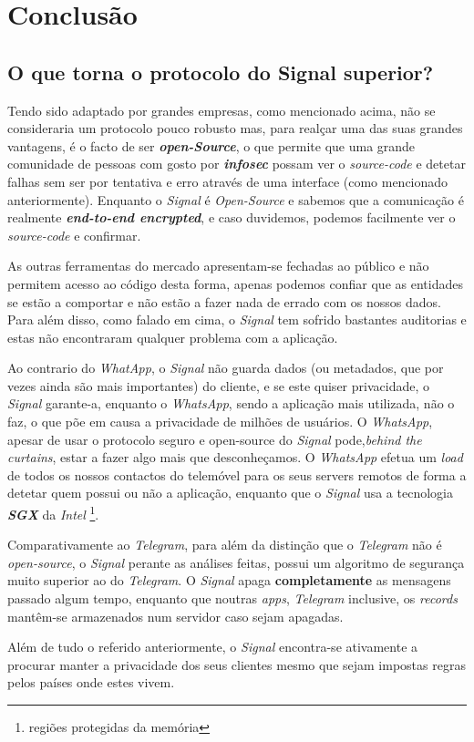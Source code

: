 \section{Conclusão}


\subsection{O que torna o protocolo do Signal superior?}

Tendo sido adaptado por grandes empresas, como mencionado acima, não se consideraria um protocolo pouco robusto mas, para realçar uma das suas grandes vantagens, é o facto de ser \textbf{\textit{open-Source}}, o que permite que uma grande comunidade de pessoas com gosto por \textit{\textbf{infosec}} possam ver o \textit{source-code} e detetar falhas sem ser por tentativa e erro através de uma interface (como mencionado anteriormente). Enquanto o \textit{Signal} é \textit{Open-Source} e sabemos que a comunicação é realmente \textbf{\textit{end-to-end encrypted}}, e caso duvidemos, podemos facilmente ver o \textit{source-code} e confirmar. 

As outras ferramentas do mercado apresentam-se fechadas ao público e não permitem acesso ao código desta forma, apenas podemos confiar que as entidades se estão a comportar e não estão a fazer nada de errado com os nossos dados. Para além disso, como falado em cima, o \textit{Signal} tem sofrido bastantes auditorias e estas não encontraram qualquer problema com a aplicação.

Ao contrario do \textit{WhatApp}, o \textit{Signal} não guarda dados (ou metadados, que por vezes ainda são mais importantes) do cliente, e se este quiser privacidade, o \textit{Signal} garante-a, enquanto o \textit{WhatsApp}, sendo a aplicação mais utilizada, não o faz, o que põe em causa a privacidade de milhões de usuários. O \textit{WhatsApp}, apesar de usar o protocolo seguro e open-source do \textit{Signal} pode,\textit{behind the curtains}, estar a fazer algo mais que desconheçamos. O \textit{WhatsApp} efetua um \textit{load} de todos os nossos contactos do telemóvel para os seus servers remotos de forma a detetar quem possui ou não a aplicação, enquanto que o \textit{Signal} usa a tecnologia \textit{\textbf{SGX}} da \textit{Intel} \footnote{regiões protegidas da memória}. 

Comparativamente ao \textit{Telegram}, para além da distinção que o \textit{Telegram} não é \textit{open-source}, o \textit{Signal} perante as análises feitas, possui um algoritmo de segurança muito superior ao do \textit{Telegram}. O \textit{Signal} apaga \textbf{completamente} as mensagens passado algum tempo, enquanto que noutras \textit{apps}, \textit{Telegram} inclusive, os \textit{records} mantêm-se armazenados num servidor caso sejam apagadas.

Além de tudo o referido anteriormente, o \textit{Signal} encontra-se ativamente a procurar manter a privacidade dos seus clientes mesmo que sejam impostas regras pelos países onde estes vivem.
